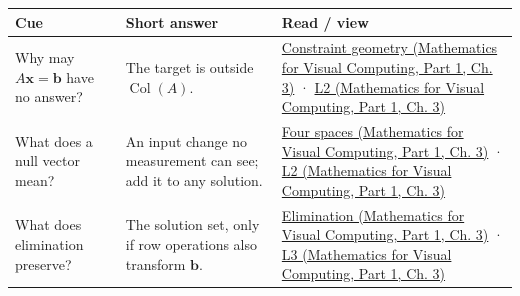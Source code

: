 {\def\LTcaptype{none} %
\begin{longtable}[]{@{}
  >{\raggedright\arraybackslash}p{}
  >{\raggedright\arraybackslash}p{}
  >{\raggedright\arraybackslash}p{}@{}}
\toprule\noalign{}
\begin{minipage}[b]{\linewidth}\raggedright
Cue
\end{minipage} & \begin{minipage}[b]{\linewidth}\raggedright
Short answer
\end{minipage} & \begin{minipage}[b]{\linewidth}\raggedright
Read / view
\end{minipage} \\
\midrule\noalign{}
\endhead
\bottomrule\noalign{}
\endlastfoot
Why may \(A\mathbf x=\mathbf b\) have no answer? & The target is outside \(\operatorname{Col}(A)\). & \href{../02-Mathematics-for-Visual-Computing-P01/main.pdf\#01-foundations-i-ch019-a-linear-equation-is-a-measurement-and-several-equations-are-geometry}{Constraint geometry (Mathematics for Visual Computing, Part 1, Ch. 3)} · \href{../02-Mathematics-for-Visual-Computing-P01/main.pdf\#01-foundations-i-ch019-figure-l2---consistency-freedom-and-the-four-fundamental-spaces}{L2 (Mathematics for Visual Computing, Part 1, Ch. 3)} \\
What does a null vector mean? & An input change no measurement can see; add it to any solution. & \href{../02-Mathematics-for-Visual-Computing-P01/main.pdf\#01-foundations-i-ch019-rank-separates-what-the-measurements-determine-from-what-they-leave-free}{Four spaces (Mathematics for Visual Computing, Part 1, Ch. 3)} · \href{../02-Mathematics-for-Visual-Computing-P01/main.pdf\#01-foundations-i-ch019-figure-l2---consistency-freedom-and-the-four-fundamental-spaces}{L2 (Mathematics for Visual Computing, Part 1, Ch. 3)} \\
What does elimination preserve? & The solution set, only if row operations also transform \(\mathbf b\). & \href{../02-Mathematics-for-Visual-Computing-P01/main.pdf\#01-foundations-i-ch019-elimination-turns-the-geometry-into-an-auditable-calculation}{Elimination (Mathematics for Visual Computing, Part 1, Ch. 3)} · \href{../02-Mathematics-for-Visual-Computing-P01/main.pdf\#01-foundations-i-ch019-figure-l3---elimination-stores-work-for-later-solves}{L3 (Mathematics for Visual Computing, Part 1, Ch. 3)} \\

\end{longtable}}
